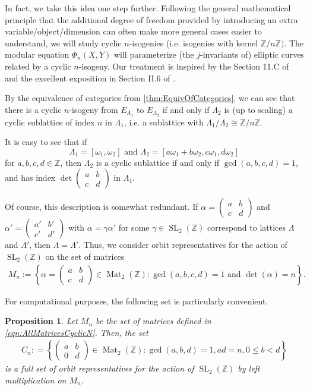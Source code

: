 \documentclass{amsart}
\newtheorem{prop}[thm]{Proposition}
\theoremstyle{definition}
\theoremstyle{remark}
\numberwithin{equation}{section}
\newcommand{\bbZ}{\mathbb Z}
\newcommand{\twobytwo}[4]{\left(\begin{array}{cc} #1 & #2 \\ #3 & #4\end{array} \right)}
\DeclareMathOperator{\Mat}{Mat}
\DeclareMathOperator{\SL}{SL}
\begin{document}
 In fact, we take this idea one step further. Following the general mathematical principle that the additional degree of freedom provided by introducing an extra variable/object/dimension can often make more general cases easier to understand, we will study cyclic $n$-isogenies (i.e. isogenies with kernel $\bbZ/n\bbZ)$. The modular equation $\Phi_{n}(X,Y)$ will parameterize (the $j$-invariants of) elliptic curves related by a cyclic $n$-isogeny. Our treatment is inspired by the  Section 11.C of \cite{CoxPrimes} and the excellent exposition in Section II.6 of \cite{SilvermanATAEC}.

By the equivalence of categories from \ref{thm:EquivOfCategories}, we can see that there is a cyclic $n$-isogeny from $E_{\Lambda_{1}}$ to $E_{\Lambda_{2}}$ if and only if $\Lambda_{2}$ is (up to scaling) a cyclic sublattice of index $n$ in $\Lambda_{1}$, i.e. a sublattice with $\Lambda_{1}/\Lambda_{2} \cong \bbZ/n\bbZ$. 

It is easy to see that if 
\[
\Lambda_{1} = [\omega_{1}, \omega_{2}]  \text{ and } \Lambda_{2} = [a\omega_{1} + b\omega_{2}, c\omega_{1}, d\omega_{2}]
\]
for $a,b,c,d \in \bbZ$, then $\Lambda_{2}$ is a cyclic sublattice if and only if $\gcd(a,b,c,d) = 1$, and has index $\det \twobytwo{a}{b}{c}{d}$ in $\Lambda_{1}$.

Of course, this description is somewhat redundant. If $\alpha = \twobytwo{a}{b}{c}{d}$ and $\alpha' = \twobytwo{a'}{b'}{c'}{d'}$ with $\alpha = \gamma \alpha'$ for some $\gamma \in \SL_{2}(\bbZ)$ correspond to lattices $\Lambda$ and $\Lambda'$, then $\Lambda = \Lambda'$. Thus, we consider orbit representatives for the action of $\SL_{2}(\bbZ)$ on the set of matrices 
\begin{align} \label{eqn:AllMatricesCyclicN}
M_{n} := \left\{
\alpha = \twobytwo{a}{b}{c}{d} \in \Mat_{2}(\bbZ): \gcd(a,b,c,d) = 1 \text{ and } \det(\alpha) = n
\right\}.
\end{align}

For computational purposes, the following set is particularly convenient.

\begin{prop} \label{prop:OrbitRepresentatives}
Let $M_{n}$ be the set of matrices defined in \eqref{eqn:AllMatricesCyclicN}. Then, the set
\begin{align} \label{eqn:CosetRepsCyclicN}
C_{n} : = \left\{ \twobytwo{a}{b}{0}{d} \in \Mat_{2}(\bbZ): \gcd(a,b,d) = 1, ad = n, 0 \leq b < d\right\}
\end{align}
is a full set of orbit representatives for the action of $\SL_{2}(\bbZ)$ by left multiplication on $M_{n}$.
\end{prop}
\end{document}
